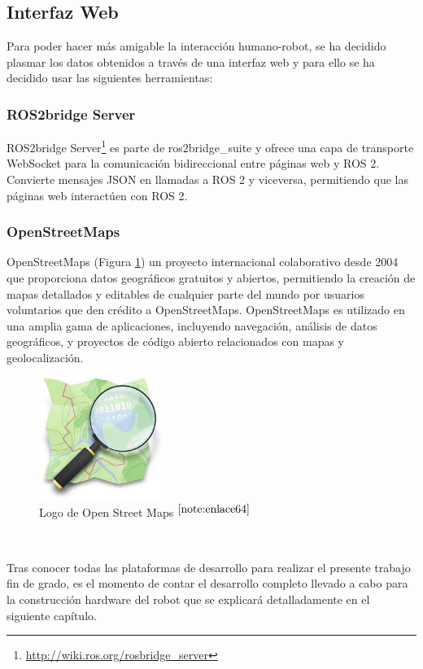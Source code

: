 \setcounter{footnote}{62} %


\subsection{Interfaz Web}

Para poder hacer más amigable la interacción humano-robot, se ha decidido plasmar los datos obtenidos a través de una interfaz web y para ello se ha decidido usar las siguientes herramientas: 
 
\subsubsection{ROS2bridge Server}

ROS2bridge Server\footnote{\url{http://wiki.ros.org/rosbridge_server}} es parte de ros2bridge\_suite y ofrece una capa de transporte WebSocket para la comunicación bidireccional entre páginas web y \acs{ROS} 2. Convierte mensajes JSON en llamadas a \acs{ROS} 2 y viceversa, permitiendo que las páginas web interactúen con \acs{ROS} 2. 

\subsubsection{OpenStreetMaps}

OpenStreetMaps (Figura \ref{fig:osm}) un proyecto internacional colaborativo desde 2004 que proporciona datos geográficos gratuitos y abiertos, permitiendo la creación de mapas detallados y editables de cualquier parte del mundo por usuarios voluntarios que den crédito a OpenStreetMaps. OpenStreetMaps es utilizado en una amplia gama de aplicaciones, incluyendo navegación, análisis de datos geográficos, y proyectos de código abierto relacionados con mapas y geolocalización.


\begin{figure} [h!]
	\begin{center}
		\includegraphics[width=4cm]{figs/osm.png}
	\end{center}
	\caption{Logo de Open Street Maps $^{\ref{note:enlace64}}$} 
	\label{fig:osm}
\end{figure}\

\setcounter{footnote}{64} %

Tras conocer todas las plataformas de desarrollo para realizar el presente trabajo fin de grado, es el momento de contar el desarrollo completo llevado a cabo para la construcción hardware del robot que se explicará detalladamente en el siguiente capítulo.
